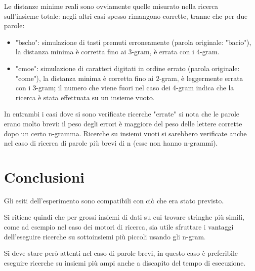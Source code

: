 \documentclass[]{article}
\begin{document}
Le distanze minime reali sono ovviamente quelle misurato nella ricerca sull'insieme totale: negli altri casi spesso rimangono corrette, tranne che per due parole:
\begin{itemize}
\item "bscho": simulazione di tasti premuti erroneamente (parola originale: "bacio"), la distanza minima è corretta fino ai 3-gram, è errata con i 4-gram.
\item "cmoe": simulazione di caratteri digitati in ordine errato (parola originale: "come"), la distanza minima è corretta fino ai 2-gram, è leggermente errata con i 3-gram; il numero che viene fuori nel caso dei 4-gram indica che la ricerca è stata effettuata su un insieme vuoto.
\end{itemize}
In entrambi i casi dove si sono verificate ricerche "errate" si nota che le parole erano molto brevi: il peso degli errori è maggiore del peso delle lettere corrette dopo un certo n-gramma.
Ricerche su insiemi vuoti si sarebbero verificate anche nel caso di ricerca di parole più brevi di n (esse non hanno n-grammi).

\section{Conclusioni}
Gli esiti dell'esperimento sono compatibili con ciò che era stato previsto.

Si ritiene quindi che per grossi insiemi di dati su cui trovare stringhe più simili, come ad esempio nel caso dei motori di ricerca, sia utile sfruttare i vantaggi dell'eseguire ricerche su sottoinsiemi più piccoli usando gli n-gram.

Si deve stare però attenti nel caso di parole brevi, in questo caso è preferibile eseguire ricerche su insiemi più ampi anche a discapito del tempo di esecuzione.
\end{document}
